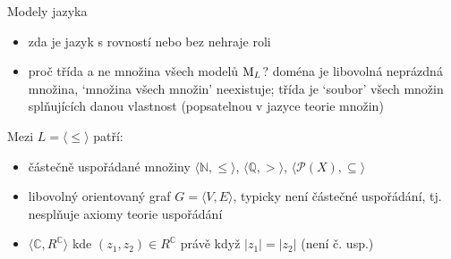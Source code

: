 \documentclass{beamer}
\begin{document}
\begin{frame}{Modely jazyka}

    \medskip

    \pause

    \pause
    \begin{itemize}
        \item zda je jazyk s rovností nebo bez nehraje roli\pause
        \item proč \alert{třída} a ne \alert{množina} všech modelů $\operatorname{M}_L$? doména je libovolná neprázdná množina, `množina všech množin' neexistuje; třída je \alert{`soubor'} všech množin splňujících danou vlastnost (popsatelnou v \alert{jazyce teorie množin})\pause
    \end{itemize}
    
    Mezi  $L=\langle \leq \rangle$ patří:\pause
    \begin{itemize}
        \item částečně uspořádané množiny $\langle \mathbb N,\leq\rangle$, $\langle \mathbb Q, > \rangle$, $\langle\mathcal P(X),\subseteq\rangle$\pause
        \item libovolný orientovaný graf $G=\langle V,E\rangle$, typicky není částečné uspořádání, tj. nesplňuje axiomy \alert{teorie uspořádání}\pause
        \item $\langle \mathbb C,R^\mathbb C\rangle$ kde $(z_1,z_2)\in R^\mathbb C$ právě když $|z_1|=|z_2|$ (není č. usp.)
    \end{itemize}

\end{frame}
\end{document}
